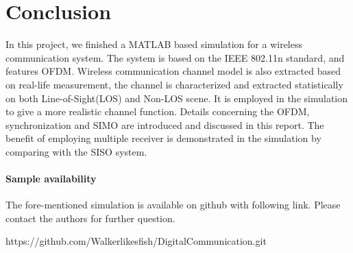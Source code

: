 \documentclass[a4paper]{article}
\begin{document}
	\section{Conclusion}
	In this project, we finished a MATLAB based simulation for a wireless communication system. The system is based on the IEEE 802.11n standard, and features OFDM. Wireless communication channel model is also extracted based on real-life measurement, the channel is characterized and extracted statistically on both Line-of-Sight(LOS) and Non-LOS scene. It is employed in the simulation to give a more realistic channel function. Details concerning the OFDM, synchronization and SIMO are introduced and discussed in this report. The benefit of employing multiple receiver is demonstrated in the simulation by comparing with the SISO system. 
    
	\paragraph{Sample availability} The fore-mentioned simulation is available on github with following link. Please contact the authors for further question. 
    
    https://github.com/Walkerlikesfish/DigitalCommunication.git
	
\end{document}
